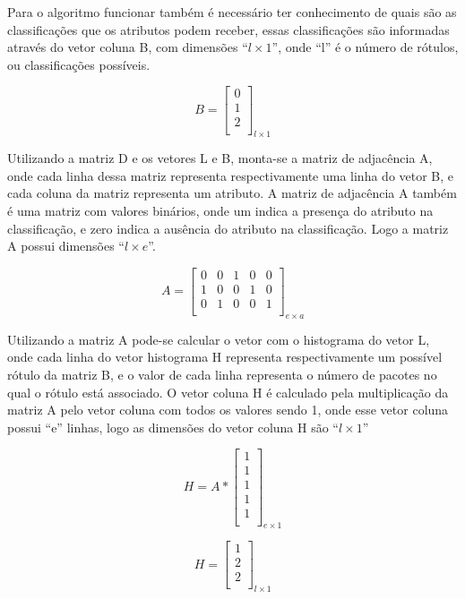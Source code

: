 Para o algoritmo funcionar também é necessário ter conhecimento de quais são as
classificações que os atributos podem receber, essas classificações são informadas
através do vetor coluna B, com dimensões ``${l \times 1}$'', onde ``l'' é o número
de rótulos, ou classificações possíveis.

$$B=\left[
\begin{array}{c}
0 \\
1 \\
2 \\
\end{array}
\right]_{l \times 1}$$

Utilizando a matriz D e os vetores L e B, monta-se a matriz de adjacência A, onde
cada linha dessa matriz representa respectivamente uma linha do vetor B, e cada
coluna da matriz representa um atributo. A matriz de adjacência A também é uma
matriz com valores binários, onde um indica a presença do atributo na classificação,
e zero indica a ausência do atributo na classificação. Logo a matriz A possui
dimensões ``${l \times e}$''.

$$A=\left[
\begin{array}{ccccc}
0 & 0 & 1 & 0 & 0 \\
1 & 0 & 0 & 1 & 0 \\
0 & 1 & 0 & 0 & 1 \\
\end{array}
\right]_{e \times a}$$

Utilizando a matriz A pode-se calcular o vetor com o histograma do vetor L, onde
cada linha do vetor histograma H representa respectivamente um possível rótulo da
matriz B, e o valor de cada linha representa o número de pacotes no qual o rótulo
está associado. O vetor coluna H é calculado pela multiplicação da matriz A pelo
vetor coluna com todos os valores sendo 1, onde esse vetor coluna possui ``e''
linhas, logo as dimensões do vetor coluna H são ``${l \times 1}$''

$$H=A * \left[
\begin{array}{c}
1 \\
1 \\
1 \\
1 \\
1 \\
\end{array}
\right]_{e \times 1}$$

$$H=\left[
\begin{array}{c}
1 \\
2 \\
2 \\
\end{array}
\right]_{l \times 1}$$

